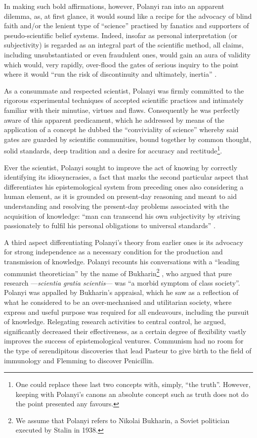 In making such bold affirmations, however, Polanyi ran into an apparent dilemma, as, at first glance, it would sound like a recipe for the advocacy of blind faith and/or the lenient type of ``science'' practised by fanatics and supporters of pseudo-scientific belief systems. Indeed, insofar as personal interpretation (or subjectivity) is regarded as an integral part of the scientific method, all claims, including unsubstantiated or even fraudulent ones, would gain an aura of validity which would, very rapidly, over-flood the gates of serious inquiry to the point where it would ``run the risk of discontinuity and ultimately, inertia'' \citep[p.37]{kane84}. 

As a consummate and respected scientist, Polanyi was firmly committed to the rigorous experimental techniques of accepted scientific practices and intimately familiar with their minutiae, virtues and flaws. Consequently he was perfectly aware of this apparent predicament, which he addressed by means of the application of a concept he dubbed the ``conviviality of science'' whereby said gates are guarded by scientific communities, bound together by common thought, solid standards, deep tradition and a desire for accuracy and rectitude\footnote{One could replace these last two concepts with, simply, ``the truth''. However, keeping with Polanyi's canons an absolute concept such as truth does not do the point presented any favours.}. 

Ever the scientist, Polanyi sought to improve the act of knowing by correctly identifying its idiosyncrasies, a fact that marks the second particular aspect that differentiates his epistemological system from preceding ones also considering a human element, as it is grounded on present-day reasoning and meant to aid understanding and resolving the present-day problems associated with the acquisition of knowledge: ``man can transcend his own subjectivity by striving passionately to fulfil his personal obligations to universal standards'' \citep[p.4]{polanyi58}.

A third aspect differentiating Polanyi's theory from earlier ones is its advocacy for strong independence as a necessary condition for the production and transmission of knowledge. Polanyi recounts his conversations with a ``leading communist theoretician'' by the name of Bukharin\footnote{We assume that Polanyi refers to Nikolai Bukharin, a	 Soviet politician executed by Stalin in 1938.} \citep{polanyi66}, who argued that pure research ---\textit{scientia gratia scientis}--- was ``a morbid symptom of class society''. Polanyi was appalled by Bukharin's appraisal, which he saw as a reflection of what he considered to be an over-mechanised and utilitarian society, where express and useful purpose was required for all endeavours, including the pursuit of knowledge. Relegating research activities to central control, he argued, significantly decreased their effectiveness, as a certain degree of flexibility vastly improves the success of epistemological ventures. Communism had no room for the type of serendipitous discoveries that lead Pasteur to give birth to the field of immunology and Flemming to discover Penicillin.

